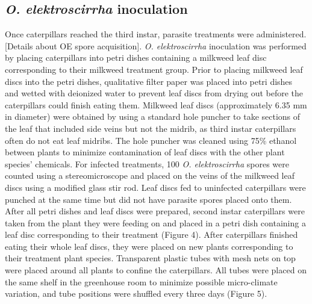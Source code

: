 \documentclass{article}
\begin{document}
\begin{multicols}{2}
    \section{\emph{O. elektroscirrha} inoculation}
    \indent Once caterpillars reached the third instar, parasite treatments were administered. [Details about OE spore acquisition]. 
    \emph{O. elektroscirrha} inoculation was performed by placing caterpillars into petri dishes containing a milkweed leaf disc corresponding to 
    their milkweed treatment group. Prior to placing milkweed leaf discs into the petri dishes, qualitative filter paper was placed into petri 
    dishes and wetted with deionized water to prevent leaf discs from drying out before the caterpillars could finish eating them. Milkweed 
    leaf discs (approximately 6.35 mm in diameter) were obtained by using a standard hole puncher to take sections of the leaf that included 
    side veins but not the midrib, as third instar caterpillars often do not eat leaf midribs. The hole puncher was cleaned using 75\% ethanol 
    between plants to minimize contamination of leaf discs with the other plant species’ chemicals. For infected treatments, 100 \emph{O. elektroscirrha} 
    spores were counted using a stereomicroscope and placed on the veins of the milkweed leaf discs using a modified glass stir rod. Leaf discs fed 
    to uninfected caterpillars were punched at the same time but did not have parasite spores placed onto them. 
    \\
    \indent After all petri dishes and leaf discs were prepared, second instar caterpillars were taken from the plant they were feeding on and placed 
    in a petri dish containing a leaf disc corresponding to their treatment (Figure 4). After caterpillars finished eating their whole leaf discs, they were placed 
    on new plants corresponding to their treatment plant species. Transparent plastic tubes with mesh nets on top were placed around all plants to 
    confine the caterpillars. All tubes were placed on the same shelf in the greenhouse room to minimize possible micro-climate variation, 
    and tube positions were shuffled every three days (Figure 5).
    \\
    \\

\end{multicols}
\end{document}
